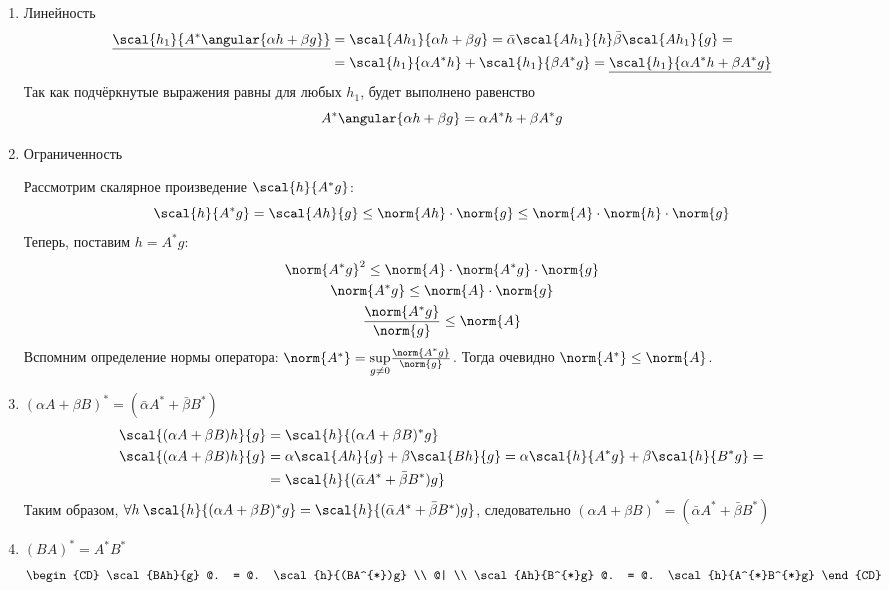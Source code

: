 	\begin{enumerate}
		\item Линейность
		\begin{align*}
			\underline{ \scal{h_1}{A^{*}\angular{\alpha h + \beta g}} } &= \scal{Ah_1}{\alpha h + \beta g} = 
			\bar{\alpha}\scal{Ah_1}{h} \bar{\beta}\scal{Ah_1}{g} = \\
			&= \scal{h_1}{\alpha A^{*} h} + \scal{h_1}{\beta A^{*} g} = 
			\underline{ \scal{h_1}{\alpha A^{*} h + \beta A^{*} g} }
		\end{align*}
		Так как подчёркнутые выражения равны для любых $h_1$, будет выполнено равенство
		$$A^{*}\angular{\alpha h + \beta g} = \alpha A^{*} h + \beta A^{*} g$$
		
		\item Ограниченность \label{bounded}
		
		Рассмотрим скалярное произведение $\scal{h}{A^{*}g}$: 
		$$\scal{h}{A^{*}g} = \scal{Ah}{g} \leq \norm{Ah}\cdot\norm{g} \leq \norm{A}\cdot\norm{h}\cdot\norm{g}$$
		Теперь, поставим $h = A^{*}g$:
		\begin{gather*}
			\norm{A^{*}g}^2 \leq \norm{A}\cdot\norm{A^{*}g}\cdot\norm{g} \\
			\norm{A^{*}g} \leq \norm{A}\cdot\norm{g} \\
			\dfrac{\norm{A^{*}g}}{\norm{g}} \leq \norm{A}
		\end{gather*}
		Вспомним определение нормы оператора: $\norm{A^{*}} = \underset{g \neq 0}{\sup} \frac{\norm{A^{*}g}}{\norm{g}}$. Тогда очевидно
		$\norm{A^{*}} \leq \norm{A}$.
		
		\item $(\alpha A + \beta B)^{*} = (\bar{\alpha}A^{*} + \bar{\beta}B^{*})$ \label{conjlin}
		\begin{align*}
			\scal{(\alpha A + \beta B)h}{g} &= \scal{h}{(\alpha A + \beta B)^{*}g} \\
			\scal{(\alpha A + \beta B)h}{g} &= \alpha\scal{Ah}{g} + \beta\scal{Bh}{g} 
			= \alpha\scal{h}{A^{*}g} + \beta \scal{h}{B^{*}g} = \\
			&= \scal{h}{(\bar{\alpha}A^{*} + \bar{\beta}B^{*})g}
		\end{align*}
		Таким образом, $\forall h\: \scal{h}{(\alpha A + \beta B)^{*}g} = \scal{h}{(\bar{\alpha}A^{*} + \bar{\beta}B^{*})g}$, 
		следовательно $(\alpha A + \beta B)^{*} = (\bar{\alpha}A^{*} + \bar{\beta}B^{*})$ \\
		
		\item $(BA)^{*} = A^{*}B^{*}$
		$$
		\begin{CD}
			\scal{BAh}{g} @. = @. \scal{h}{(BA^{*})g} \\
				@| \\
			\scal{Ah}{B^{*}g} @. = @. \scal{h}{A^{*}B^{*}g}
		\end{CD}
		$$
		

\end{enumerate}
